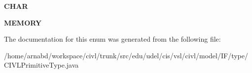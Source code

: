 \begin{DoxyCompactItemize}
\item 
\hypertarget{enumedu_1_1udel_1_1cis_1_1vsl_1_1civl_1_1model_1_1IF_1_1type_1_1CIVLPrimitiveType_1_1PrimitiveTypeKind_ad4013f9765a5c43007c8bf4c33cd16ff}{}{\bfseries C\+H\+A\+R}\label{enumedu_1_1udel_1_1cis_1_1vsl_1_1civl_1_1model_1_1IF_1_1type_1_1CIVLPrimitiveType_1_1PrimitiveTypeKind_ad4013f9765a5c43007c8bf4c33cd16ff}

\item 
\hypertarget{enumedu_1_1udel_1_1cis_1_1vsl_1_1civl_1_1model_1_1IF_1_1type_1_1CIVLPrimitiveType_1_1PrimitiveTypeKind_a1386a4af458b74bdc9f8f7076d472abc}{}{\bfseries M\+E\+M\+O\+R\+Y}\label{enumedu_1_1udel_1_1cis_1_1vsl_1_1civl_1_1model_1_1IF_1_1type_1_1CIVLPrimitiveType_1_1PrimitiveTypeKind_a1386a4af458b74bdc9f8f7076d472abc}

\end{DoxyCompactItemize}


The documentation for this enum was generated from the following file\+:\begin{DoxyCompactItemize}
\item 
/home/arnabd/workspace/civl/trunk/src/edu/udel/cis/vsl/civl/model/\+I\+F/type/C\+I\+V\+L\+Primitive\+Type.\+java\end{DoxyCompactItemize}
